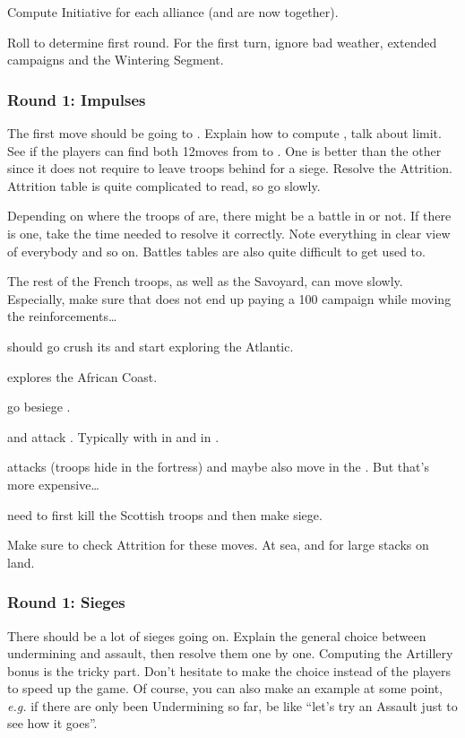 \aparag Compute Initiative for each alliance (\POL and \RUS are now together).

\aparag Roll to determine first round. For the first turn, ignore bad weather,
extended campaigns and the Wintering Segment.

\subsubsection{Round 1: Impulses}
\aparag The first move should be \FRA going to \villeNaples.
\bparag Explain how to compute \MP, talk about \MP limit. See if the players
can find both 12\MP moves from \provinceProvence to \provinceCampania. One is
better than the other since it does not require to leave troops behind for a
siege.
\bparag Resolve the Attrition. Attrition table is quite complicated to read,
so go slowly.

\aparag Depending on where the troops of \paysNaples are, there might be a
battle in \provinceCampania or not. If there is one, take the time needed to
resolve it correctly. Note everything in clear view of everybody and so
on. Battles tables are also quite difficult to get used to.

\aparag The rest of the French troops, as well as the Savoyard, can move
slowly. Especially, make sure that \FRA does not end up paying a 100\ducats
campaign while moving the reinforcements\ldots

\aparag \HIS should go crush its \REVOLT and start exploring the Atlantic.

\aparag \POR explores the African Coast.

\aparag \VEN go besiege \villeRagusa.

\aparag \POL and \RUS attack \paysCosaquesdon. Typically with \RUS in
 and \POL in \provinceDonets.

\aparag \TUR attacks \paysGeorgie (troops hide in the fortress) and maybe also
move in the \regionBalkans. But that's more expensive\ldots

\aparag \ANG need to first kill the Scottish troops and then make siege.

\aparag Make sure to check Attrition for these moves. At sea, and for large
stacks on land.

\subsubsection{Round 1: Sieges}
\aparag There should be a lot of sieges going on. Explain the general choice
between undermining and assault, then resolve them one by one. Computing the
Artillery bonus is the tricky part.
\bparag Don't hesitate to make the choice instead of the players to speed up
the game.
\bparag Of course, you can also make an example at some point, \emph{e.g.} if
there are only been Undermining so far, be like ``let's try an Assault just to
see how it goes''.

